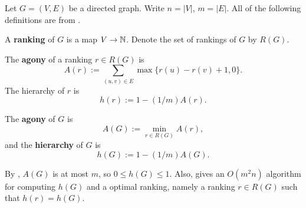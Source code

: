 \documentclass[11pt]{amsart}
\begin{document}
Let $G = (V, E)$ be a directed graph. Write $n = |V|$, $m = |E|$. All of the following definitions are from \cite{hier1}.

\begin{defn}
A {\bf ranking} of $G$ is a map $V \to \mathbb{N}$. Denote the set of rankings of $G$ by $R(G)$.
\end{defn}

\begin{defn}
The {\bf agony} of a ranking $r \in R(G)$ is
$$
A(r) := \sum_{(u, v) \in E} \max \{ r(u) - r(v) + 1, 0\}.
$$
The hierarchy of $r$ is
$$
h(r) := 1 - (1/m)A(r).
$$ 
\end{defn}

\begin{defn}
The {\bf agony} of $G$ is
$$
A(G) := \min_{r \in R(G)}A(r),
$$
and the {\bf hierarchy} of $G$ is 
$$
h(G) := 1 - (1/m)A(G).
$$
\end{defn}

By \cite{hier1}, $A(G)$ is at most $m$, so $0 \leq h(G) \leq 1$. Also, \cite{hier1} gives an $O(m^2n)$ algorithm for computing $h(G)$ and a optimal ranking, namely a ranking $r \in R(G)$ such that $h(r) = h(G)$.
\end{document}
